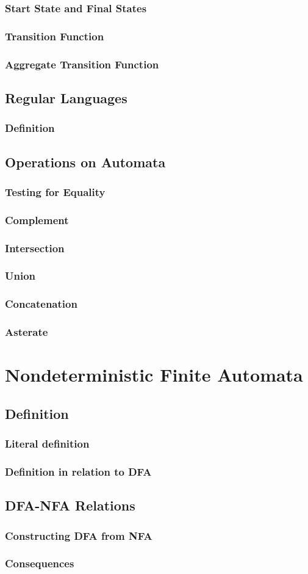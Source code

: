 \documentclass[12pt]{article}
\begin{document}
	\subsubsection{Start State and Final States}
	\subsubsection{Transition Function}
	\subsubsection{Aggregate Transition Function}
	\subsection{Regular Languages}
	\subsubsection{Definition}
	\subsection{Operations on Automata}
	\subsubsection{Testing for Equality}
	\subsubsection{Complement}
	\subsubsection{Intersection}
	\subsubsection{Union}
	\subsubsection{Concatenation}
	\subsubsection{Asterate}
	\section{Nondeterministic Finite Automata}
	\subsection{Definition}
	\subsubsection{Literal definition}
	\subsubsection{Definition in relation to DFA}
	\subsection{DFA-NFA Relations}
	\subsubsection{Constructing DFA from NFA}
	\subsubsection{Consequences} 
\end{document}
